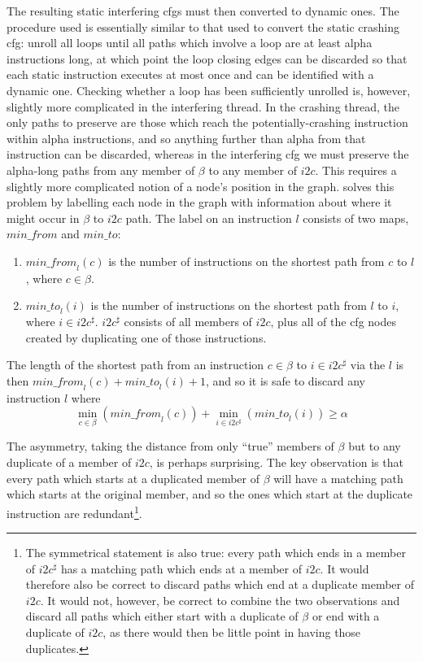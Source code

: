 The resulting static interfering \glspl{cfg} must then converted to
dynamic ones.  The procedure used is essentially similar to that used
to convert the static crashing \gls{cfg}: unroll all loops until all
paths which involve a loop are at least \gls{alpha} instructions long,
at which point the loop closing edges can be discarded so that each
static instruction executes at most once and can be identified with a
dynamic one.  Checking whether a loop has been sufficiently unrolled
is, however, slightly more complicated in the interfering thread.  In
the crashing thread, the only paths to preserve are those which reach
the potentially-crashing instruction within \gls{alpha} instructions,
and so anything further than \gls{alpha} from that instruction can be
discarded, whereas in the interfering \gls{cfg} we must preserve the
\gls{alpha}-long paths from any member of $\beta$ to any member of
$i2c$.  This requires a slightly more complicated notion of a node's
position in the graph.  {\Technique} solves this
problem by labelling each node in the graph
with information about where it might occur in $\beta$ to $i2c$ path.
The label on an instruction $l$ consists of two maps,
$\mathit{min\_from}$ and $\mathit{min\_to}$:
\vspace{-1pt}
\begin{enumerate}
\item
  $\mathit{min\_from}_l(c)$ is the number of instructions on the
  shortest path from $c$ to $l$, where $c \in \beta$.
\vspace{-12pt}
\item
  $\mathit{min\_to}_l(i)$ is the number of instructions on the
  shortest path from $l$ to $i$, where $i \in i2c^\sharp$.
  $i2c^\sharp$ consists of all members of $i2c$, plus all of the
  \gls{cfg} nodes created by duplicating one of those instructions.
\end{enumerate}
The length of the shortest path from an instruction $c
\in \beta$ to $i \in i2c^\sharp$ via the $l$ is then
$\mathit{min\_from}_l(c) + \mathit{min\_to}_l(i) + 1$, and so it is safe
to discard any instruction $l$ where
\begin{displaymath}
\min_{c \in \beta}\left(\mathit{min\_from}_l(c)\right) + \min_{i \in i2c^\sharp}\left(\mathit{min\_to}_l(i)\right) {\geq} \alpha
\end{displaymath}

The asymmetry, taking the distance from only ``true'' members of
$\beta$ but to any duplicate of a member of $i2c$, is perhaps
surprising.  The key observation is that every path which starts at a
duplicated member of $\beta$ will have a matching path which starts at
the original member, and so the ones which start at the duplicate
instruction are redundant\footnote{The symmetrical statement is also
  true: every path which ends in a member of $i2c^\sharp$ has a
  matching path which ends at a member of $i2c$.  It would therefore
  also be correct to discard paths which end at a duplicate member of
  $i2c$.  It would not, however, be correct to combine the two
  observations and discard all paths which either start with a
  duplicate of $\beta$ or end with a duplicate of $i2c$, as there
  would then be little point in having those duplicates.}.

